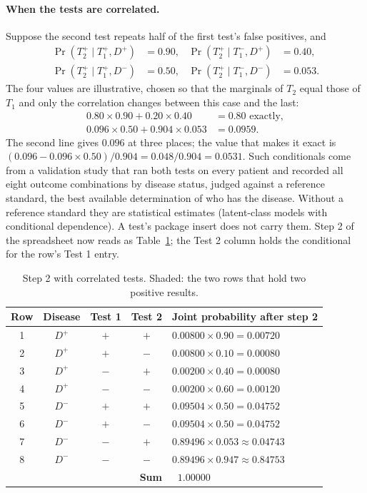 \documentclass[11pt]{article}
\begin{document}
\paragraph{When the tests are correlated.} Suppose the second test repeats half of the first test's false positives, and
\begin{align*}
  \Pr(T_2^+ \mid T_1^+, D^+)      &= 0.90, & \Pr(T_2^+ \mid T_1^-, D^+)      &= 0.40, \\
  \Pr(T_2^+ \mid T_1^+, D^-) &= 0.50, & \Pr(T_2^+ \mid T_1^-, D^-) &= 0.053.
\end{align*}
The four values are illustrative, chosen so that the marginals of $T_2$ equal those of $T_1$ and only the correlation changes between this case and the last:
\begin{align*}
  0.80 \times 0.90 + 0.20 \times 0.40 &= 0.80 \text{ exactly}, \\
  0.096 \times 0.50 + 0.904 \times 0.053 &= 0.0959.
\end{align*}
The second line gives $0.096$ at three places; the value that makes it exact is $(0.096 - 0.096 \times 0.50) / 0.904 = 0.048 / 0.904 = 0.0531$. Such conditionals come from a validation study that ran both tests on every patient and recorded all eight outcome combinations by disease status, judged against a reference standard, the best available determination of who has the disease. Without a reference standard they are statistical estimates (latent-class models with conditional dependence). A test's package insert does not carry them. Step 2 of the spreadsheet now reads as Table~\ref{tab:corr}; the Test 2 column holds the conditional for the row's Test 1 entry.

\begin{table}[H]
\centering
\renewcommand{\arraystretch}{1.15}
\begin{tabular}{c|c|c|c|l}
\toprule
\textbf{Row} & \textbf{Disease} & \textbf{Test 1} & \textbf{Test 2} & \textbf{Joint probability after step 2} \\
\midrule
\rowcolor{rowsel} 1 & $D^+$ & $+$ & $+$ & $0.00800 \times 0.90 = 0.00720$ \\
2 & $D^+$      & $+$ & $-$ & $0.00800 \times 0.10  = 0.00080$ \\
3 & $D^+$      & $-$ & $+$ & $0.00200 \times 0.40  = 0.00080$ \\
4 & $D^+$      & $-$ & $-$ & $0.00200 \times 0.60  = 0.00120$ \\
\rowcolor{rowsel} 5 & $D^-$ & $+$ & $+$ & $0.09504 \times 0.50 = 0.04752$ \\
6 & $D^-$ & $+$ & $-$ & $0.09504 \times 0.50  = 0.04752$ \\
7 & $D^-$ & $-$ & $+$ & $0.89496 \times 0.053 \approx 0.04743$ \\
8 & $D^-$ & $-$ & $-$ & $0.89496 \times 0.947 \approx 0.84753$ \\
\midrule
  & \multicolumn{3}{r|}{\textbf{Sum}} & $\;\;\mathbf{1.00000}$ \\
\bottomrule
\end{tabular}
\caption{Step 2 with correlated tests. Shaded: the two rows that hold two positive results.}
\label{tab:corr}
\end{table}
\end{document}
